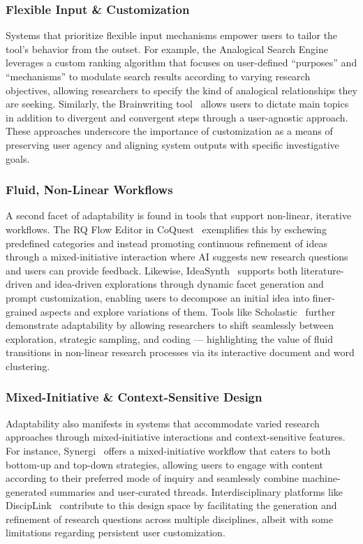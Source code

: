 \subsubsection{Flexible Input \& Customization} Systems that prioritize flexible input mechanisms empower users to tailor the tool’s behavior from the outset. For example, the Analogical Search Engine~\cite{AnalogicalSearchEngine} leverages a custom ranking algorithm that focuses on user-defined “purposes” and “mechanisms” to modulate search results according to varying research objectives, allowing researchers to specify the kind of analogical relationships they are seeking. Similarly, the Brainwriting tool~\cite{brainwriting} allows users to dictate main topics in addition to divergent and convergent steps through a user-agnostic approach. These approaches underscore the importance of customization as a means of preserving user agency and aligning system outputs with specific investigative goals.

\subsubsection{Fluid, Non-Linear Workflows} A second facet of adaptability is found in tools that support non-linear, iterative workflows. The RQ Flow Editor in CoQuest~\cite{CoQuest} exemplifies this by eschewing predefined categories and instead promoting continuous refinement of ideas through a mixed-initiative interaction where AI suggests new research questions and users can provide feedback. Likewise, IdeaSynth~\cite{IdeaSynth} supports both literature-driven and idea-driven explorations through dynamic facet generation and prompt customization, enabling users to decompose an initial idea into finer-grained aspects and explore variations of them. Tools like Scholastic~\cite{scholastic} further demonstrate adaptability by allowing researchers to shift seamlessly between exploration, strategic sampling, and coding — highlighting the value of fluid transitions in non-linear research processes via its interactive document and word clustering.

\subsubsection{Mixed-Initiative \& Context-Sensitive Design} 
Adaptability also manifests in systems that accommodate varied research approaches through mixed-initiative interactions and context-sensitive features. For instance, Synergi~\cite{synergi} offers a mixed-initiative workflow that caters to both bottom-up and top-down strategies, allowing users to engage with content according to their preferred mode of inquiry and seamlessly combine machine-generated summaries and user-curated threads. Interdisciplinary platforms like DiscipLink~\cite{disciplink} contribute to this design space by facilitating the generation and refinement of research questions across multiple disciplines, albeit with some limitations regarding persistent user customization.

